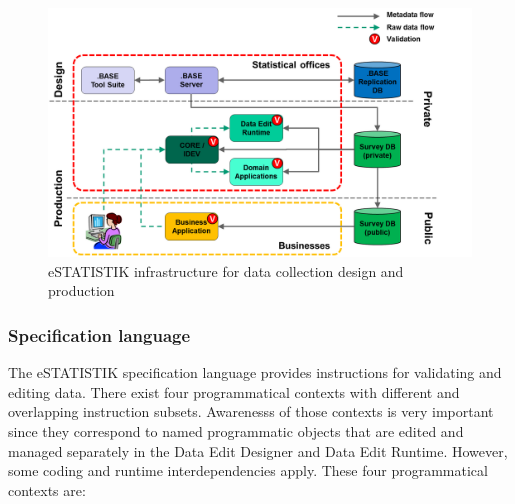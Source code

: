 \begin{figure}[!ht]
\begin{center}
\includegraphics[scale=0.5]{fig/estatinfra.png} 
\end{center}
\caption{eSTATISTIK infrastructure for data collection design and production}
\label{estatinfra}
\end{figure}

\subsubsection{Specification language}

The eSTATISTIK specification language provides instructions for validating and editing data. There exist four programmatical contexts with different and overlapping instruction subsets. Awarenesss of those contexts is very important since they correspond to named programmatic objects that are edited and managed separately in the Data Edit Designer and Data Edit Runtime. However, some coding and runtime interdependencies apply. These four programmatical contexts are:

